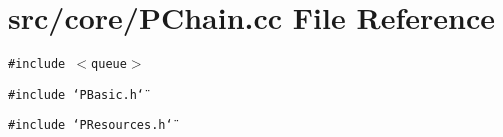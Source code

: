 \section{src/core/PChain.cc File Reference}
\label{PChain_8cc}


{\tt \#include $<$queue$>$}\par
{\tt \#include \char`\"{}PBasic.h\char`\"{}}\par
{\tt \#include \char`\"{}PResources.h\char`\"{}}\par
